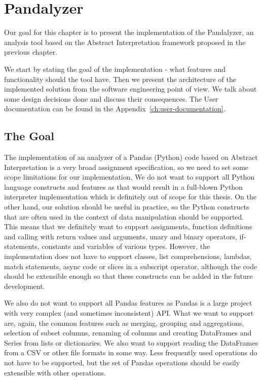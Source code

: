 \chapter{Pandalyzer}

Our goal for this chapter is to present the implementation of the Pandalyzer, an analysis tool based on the Abstract
Interpretation framework proposed in the previous chapter.

We start by stating the goal of the implementation - what features and functionality should the tool have.
Then we present the architecture of the implemented solution from the software engineering point of view.
We talk about some design decisions done and discuss their consequences.
The User documentation can be found in the Appendix~\ref{ch:user-documentation}.


\section{The Goal}

The implementation of an analyzer of a Pandas (Python) code based on Abstract Interpretation is a very
broad assignment specification, so we need to set some scope limitations for our implementation.
We do not want to support all Python language constructs and features as that would result in a full-blown Python
interpreter implementation which is definitely out of scope for this thesis.
On the other hand, our solution should be useful in practice, so the Python constructs that are often used in the
context of data manipulation should be supported.
This means that we definitely want to support assignments, function definitions and calling with return values and
arguments, unary and binary operators, if-statements, constants and variables of various types.
However, the implementation does not have to support classes, list comprehensions, lambdas, match statements, async code
or slices in a subscript operator, although the code should be extensible enough so that these constructs can be added
in the future development.


We also do not want to support all Pandas features as Pandas is a large project with very complex
(and sometimes inconsistent) API\@.
What we want to support are, again, the common features such as merging, grouping and aggregations, selection of
subset columns, renaming of columns and creating DataFrames and Series from lists or dictionaries.
We also want to support reading the DataFrames from a CSV or other file formats in some way.
Less frequently used operations do not have to be supported, but the set of Pandas operations should be easily
extensible with other operations.

